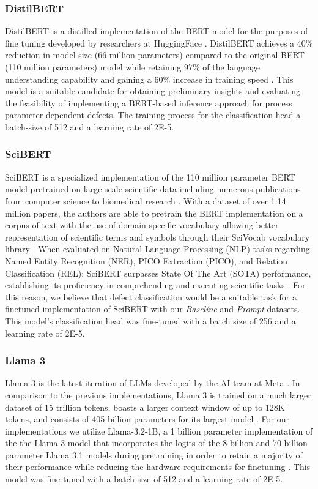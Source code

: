 \subsubsection{DistilBERT}
DistilBERT is a distilled implementation of the BERT model for the purposes of
fine tuning developed by researchers at HuggingFace \cite{sanh_distilbert_2020}.
DistilBERT achieves a 40\% reduction in model size (66 million parameters)
compared to the original BERT (110 million parameters) model while retaining
97\% of the language understanding capability and gaining a 60\% increase in
training speed \cite{sanh_distilbert_2020}. This model is a suitable candidate
for obtaining preliminary insights and evaluating the feasibility of
implementing a BERT-based inference approach for process parameter dependent
defects. The training process for the classification head a batch-size of 512
and a learning rate of 2E-5.

\subsubsection{SciBERT}
SciBERT is a specialized implementation of the 110 million parameter BERT model
\cite{devlin_bert_2019} pretrained on large-scale scientific data including
numerous publications from computer science to biomedical research
\cite{beltagy_scibert_2019}. With a dataset of over 1.14 million papers, the
authors are able to pretrain the BERT implementation on a corpus of text with
the use of domain specific vocabulary allowing better representation of
scientific terms and symbols through their SciVocab vocabulary library
\cite{beltagy_scibert_2019}. When evaluated on Natural Language Processing (NLP)
tasks regarding Named Entity Recognition (NER), PICO Extraction (PICO), and
Relation Classification (REL); SciBERT surpasses State Of The Art (SOTA)
performance, establishing its proficiency in comprehending and executing
scientific tasks \cite{beltagy_scibert_2019}. For this reason, we believe that
defect classification would be a suitable task for a finetuned implementation of
SciBERT with our \textit{Baseline} and \textit{Prompt} datasets. This model's
classification head was fine-tuned with a batch size of 256 and a learning rate
of 2E-5.


\subsubsection{Llama 3}
Llama 3 is the latest iteration of LLMs developed by the AI team at Meta
\cite{grattafiori_llama_2024}. In comparison to the previous implementations,
Llama 3 is trained on a much larger dataset of 15 trillion tokens, boasts a
larger context window of up to 128K tokens, and consists of 405 billion
parameters for its largest model \cite{grattafiori_llama_2024}. For our
implementations we utilize Llama-3.2-1B, a 1 billion parameter implementation of
the the Llama 3 model that incorporates the logits of the 8 billion and 70
billion parameter Llama 3.1 models during pretraining in order to retain a
majority of their performance while reducing the hardware requirements for
finetuning \cite{grattafiori_llama_2024}. This model was fine-tuned with a batch
size of 512 and a learning rate of 2E-5.

